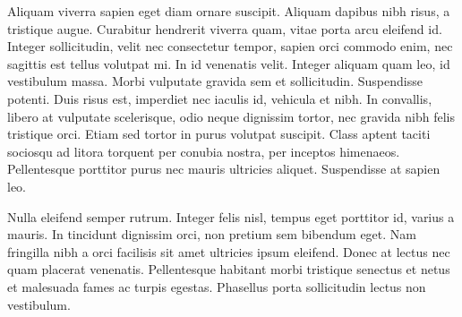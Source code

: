 Aliquam viverra sapien eget diam ornare suscipit. Aliquam dapibus nibh risus, a tristique augue. Curabitur hendrerit viverra quam, vitae porta arcu eleifend id. Integer sollicitudin, velit nec consectetur tempor, sapien orci commodo enim, nec sagittis est tellus volutpat mi. In id venenatis velit. Integer aliquam quam leo, id vestibulum massa. Morbi vulputate gravida sem et sollicitudin. Suspendisse potenti. Duis risus est, imperdiet nec iaculis id, vehicula et nibh. In convallis, libero at vulputate scelerisque, odio neque dignissim tortor, nec gravida nibh felis tristique orci. Etiam sed tortor in purus volutpat suscipit. Class aptent taciti sociosqu ad litora torquent per conubia nostra, per inceptos himenaeos. Pellentesque porttitor purus nec mauris ultricies aliquet. Suspendisse at sapien leo.

Nulla eleifend semper rutrum. Integer felis nisl, tempus eget porttitor id, varius a mauris. In tincidunt dignissim orci, non pretium sem bibendum eget. Nam fringilla nibh a orci facilisis sit amet ultricies ipsum eleifend. Donec at lectus nec quam placerat venenatis. Pellentesque habitant morbi tristique senectus et netus et malesuada fames ac turpis egestas. Phasellus porta sollicitudin lectus non vestibulum.